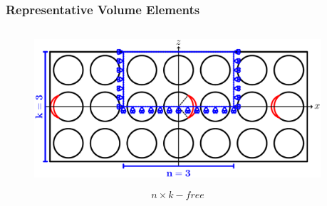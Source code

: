 \documentclass[first,firstsupp,lastsupp,last,hyperref,table]{ETHclass}
\begin{document}
\begin{frame}
\frametitle{\vspace{0.2cm}\small Representative Volume Elements}
\vspace{-1cm}
\centering
\begin{columns}[c]
\begin{column}{0.55\textwidth}
\centering
\begin{figure}
\centering
\includegraphics[width=\columnwidth]{freeThickPly.pdf}
\end{figure}
\vspace{-0.25cm}
\begin{equation*}
n\times k-free
\end{equation*}
\end{column}
\begin{column}{0.45\textwidth}
\centering
\end{column}
\end{columns}
\end{frame}

\addtocounter{framenumber}{-1}
\end{document}

